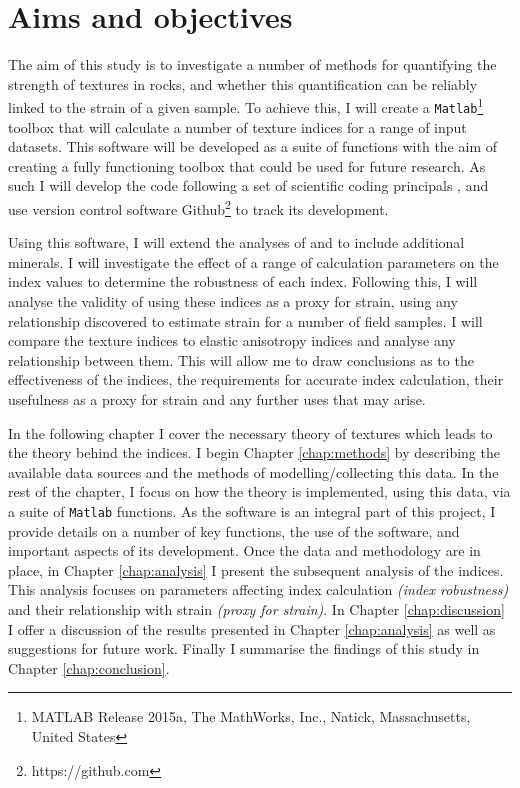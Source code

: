 \documentclass[a4paper,12pt,twoside]{report}
\numberwithin{equation}{chapter}
\begin{document}
\section{Aims and objectives} \label{sec:aims+objs}
	
The aim of this study is to investigate a number of methods for quantifying the strength of textures in rocks, and whether this quantification can be reliably linked to the strain of a given sample. To achieve this, I will create a \texttt{Matlab}\footnote{MATLAB Release 2015a, The MathWorks, Inc., Natick, Massachusetts, United States} toolbox that will calculate a number of texture indices for a range of input datasets. This software will be developed as a suite of functions with the aim of creating a fully functioning toolbox that could be used for future research. As such I will develop the code following a set of scientific coding principals \citep{Wilson2014}, and use version control software Github\footnote{https://github.com} to track its development.   

Using this software, I will extend the analyses of \cite{Skemer} and \cite{Mainprice} to include additional minerals. I will investigate the effect of a range of calculation parameters on the index values to determine the robustness of each index. Following this, I will analyse the validity of using these indices as a proxy for strain, using any relationship discovered to estimate strain for a number of field samples. I will compare the texture indices to elastic anisotropy indices and analyse any relationship between them. This will allow me to draw conclusions as to the effectiveness of the indices, the requirements for accurate index calculation, their usefulness as a proxy for strain and any further uses that may arise.  

In the following chapter I cover the necessary theory of textures which leads to the theory behind the indices. I begin Chapter \ref{chap:methods} by describing the available data sources and the methods of modelling/collecting this data. In the rest of the chapter, I focus on how the theory is implemented, using this data, via a suite of \texttt{Matlab} functions. As the software is an integral part of this project, I provide details on a number of key functions, the use of the software, and important aspects of its development. Once the data and methodology are in place, in Chapter \ref{chap:analysis} I present the subsequent analysis of the indices. This analysis focuses on parameters affecting index calculation \emph{(index robustness)} and their relationship with strain \emph{(proxy for strain)}. In Chapter \ref{chap:discussion} I offer a discussion of the results presented in Chapter \ref{chap:analysis} as well as suggestions for future work. Finally I summarise the findings of this study in Chapter \ref{chap:conclusion}.   
\end{document}
